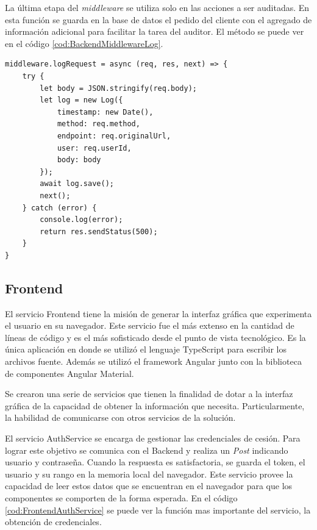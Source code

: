 La última etapa del \emph{middleware} se utiliza solo en las acciones a ser auditadas.
En esta función se guarda en la base de datos el pedido del cliente con el agregado de información adicional para facilitar la tarea del auditor. El método se puede ver en el código \ref{cod:BackendMiddlewareLog}.

\begin{lstlisting}[label=cod:BackendMiddlewareLog,caption=Persistencia de la operación]
middleware.logRequest = async (req, res, next) => {
    try {
        let body = JSON.stringify(req.body);
        let log = new Log({
            timestamp: new Date(),
            method: req.method,
            endpoint: req.originalUrl,
            user: req.userId,
            body: body
        });
        await log.save();
        next();
    } catch (error) {
        console.log(error);
        return res.sendStatus(500);
    }
}
\end{lstlisting}

\newpage

\subsection{Frontend}

El servicio Frontend tiene la misión de generar la interfaz gráfica que experimenta el usuario en su navegador.
Este servicio fue el más extenso en la cantidad de líneas de código y es el más sofisticado desde el punto de vista tecnológico.
Es la única aplicación en donde se utilizó el lenguaje TypeScript para escribir los archivos fuente.
Además se utilizó el framework Angular junto con la biblioteca de componentes Angular Material.

Se crearon una serie de servicios que tienen la finalidad de dotar a la interfaz gráfica de la capacidad de obtener la información que necesita.
Particularmente, la habilidad de comunicarse con otros servicios de la solución.

El servicio AuthService se encarga de gestionar las credenciales de cesión.
Para lograr este objetivo se comunica con el Backend y realiza un \emph{Post} indicando usuario y contraseña.
Cuando la respuesta es satisfactoria, se guarda el token, el usuario y su rango en la memoria local del navegador.
Este servicio provee la capacidad de leer estos datos que se encuentran en el navegador para que los componentes se comporten de la forma esperada.
En el código \ref{cod:FrontendAuthService} se puede ver la función mas importante del servicio, la obtención de credenciales.

